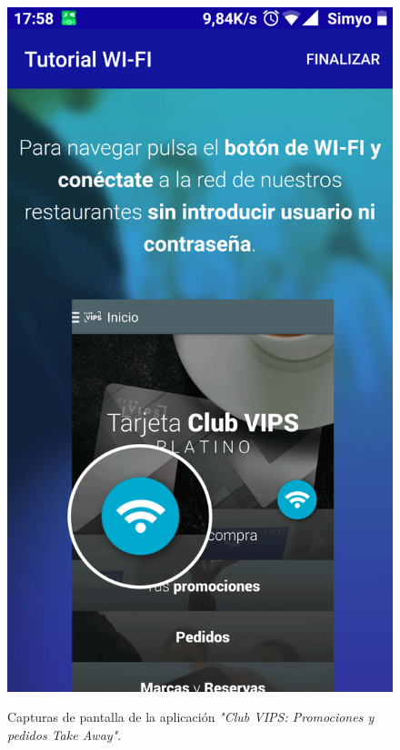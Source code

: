 \documentclass[twoside]{report}
\begin{document}
\begin{figure}[H]
\begin{center}
\includegraphics[scale=0.10]{images/restaurantes/vips2.png}
\caption{Capturas de pantalla de la aplicación \textit{"Club VIPS: Promociones y pedidos Take Away"}.} \cite{vipsapp}
\end{center}
\end{figure}
\end{document}
